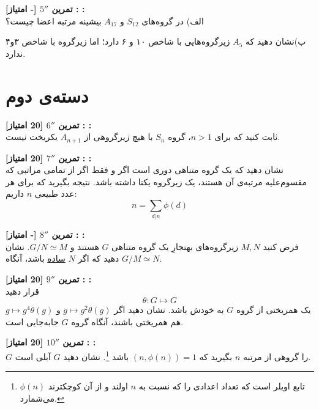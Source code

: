 \documentclass{article}
\newenvironment{exercise}[3][\unskip]{%
	\par
	\noindent
	\textbf{تمرین
		#1
		[#2 امتیاز] 
		\def\temp{#3}\ifx\temp\empty
		: 
		\else
		: #3 \vspace{0.5em} \\ \noindent
		\fi
}}{}
\begin{document}
\begin{exercise}[$5''$]{-}{ }
	الف) در گروه‌های 
	$S_{12}$
	و 
	$A_{17}$
	بیشینه مرتبه اعضا چیست؟
	
	\noindent
	ب)نشان دهید که 
	$A_5$ زیرگروه‌هایی با شاخص 
	۱۰ و ۶ دارد؛ 
	اما زیرگروه با شاخص ۳و۴ ندارد.
\end{exercise}
\section*{
	\LARGE
	دسته‌ی دوم}

\begin{exercise}[$6''$]{20}{}
	ثابت کنید که برای 
	$n>1$،
	گروه 
	$S_n$ با هیچ زیرگروهی از 
	$A_{n+1}$
	یکریخت نیست.
	
\end{exercise}


\begin{exercise}[$7''$]{20}{}
	نشان دهید که یک گروه متناهی دوری است اگر و فقط اگر از تمامی مراتبی که مقسوم‌علیه مرتبه‌ی آن هستند، یک زیرگروه یکتا داشته باشد. نتیجه بگیرید که برای هر عدد طبیعی $n$ داریم:
	\[
	n =\sum_{d|n} \phi(d)
	\]
	
\end{exercise}





\begin{exercise}[$8''$]{-}{}
	فرض کنید 
	$M,N$ 
	زیرگروه‌های بهنجارِ یک گروه متناهی 
	$G$‌ هستند و 
	$G/N \simeq M$.
	نشان دهید که اگر 
	$N$ 
	\href{https://fa.wikipedia.org/wiki/%DA%AF%D8%B1%D9%88%D9%87_%D8%B3%D8%A7%D8%AF%D9%87}{ساده}
	 باشد، آنگاه 
	$G/M \simeq N$.
	
	
\end{exercise}


\begin{exercise}[$9''$]{20}{}
	قرار دهید 
	\[
	\theta: G\longmapsto G
	\]
	یک همریختی از گروه $G$ به خودش باشد. نشان دهید اگر 
	$g \longmapsto g^2\theta(g)$
	و
	$g \longmapsto g^4\theta(g)$
	هم همریختی باشند، آنگاه گروه  $G$ جابه‌جایی است.
	
\end{exercise}


\begin{exercise}[$10''$]{20}{ }
 $G$‌ را گروهی از مرتبه 
 $n$ بگیرید که 
 $(n,\phi(n))=1$
 باشد
 \footnote{$\phi(n)$ تابع اویلر است که تعداد اعدادی را که نسبت به $n$ اولند و از آن کوچکترند می‌شمارد.}.
 نشان دهید $G$ آبلی است.
	
\end{exercise}
\end{document}
